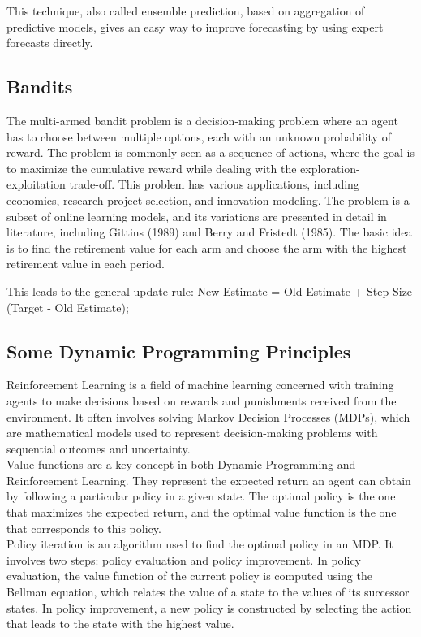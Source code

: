 \documentclass{article}
\begin{document}
This technique, also called ensemble prediction, based on aggregation of predictive models, gives an easy way to improve forecasting by using expert forecasts directly.

\subsection{Bandits}
The multi-armed bandit problem is a decision-making problem where an agent has to choose between multiple options, each with an unknown probability of reward. The problem is commonly seen as a sequence of actions, where the goal is to maximize the cumulative reward while dealing with the exploration-exploitation trade-off. This problem has various applications, including economics, research project selection, and innovation modeling. The problem is a subset of online learning models, and its variations are presented in detail in literature, including Gittins (1989) and Berry and Fristedt (1985). The basic idea is to find the retirement value for each arm and choose the arm with the highest retirement value in each period.\\
\begin{center}
This leads to the general update rule:
New Estimate = Old Estimate + Step Size (Target - Old Estimate);
\end{center}

\subsection{Some Dynamic Programming Principles}
Reinforcement Learning is a field of machine learning concerned with training agents to make decisions based on rewards and punishments received from the environment. It often involves solving Markov Decision Processes (MDPs), which are mathematical models used to represent decision-making problems with sequential outcomes and uncertainty.\\

Value functions are a key concept in both Dynamic Programming and Reinforcement Learning. They represent the expected return an agent can obtain by following a particular policy in a given state. The optimal policy is the one that maximizes the expected return, and the optimal value function is the one that corresponds to this policy.\\

Policy iteration is an algorithm used to find the optimal policy in an MDP. It involves two steps: policy evaluation and policy improvement. In policy evaluation, the value function of the current policy is computed using the Bellman equation, which relates the value of a state to the values of its successor states. In policy improvement, a new policy is constructed by selecting the action that leads to the state with the highest value.\\
\end{document}
